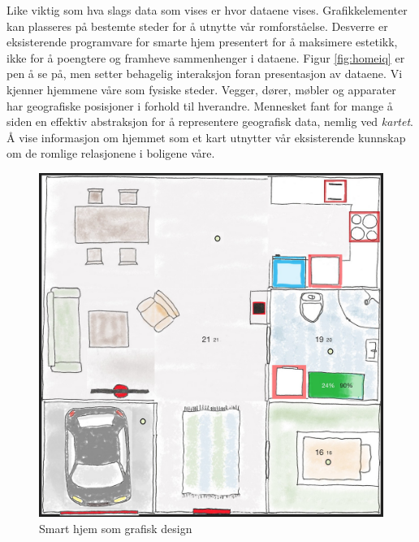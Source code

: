 Like viktig som hva slags data som vises er hvor dataene vises. Grafikkelementer kan plasseres på bestemte steder for å utnytte vår romforståelse. Desverre er eksisterende programvare for smarte hjem presentert for å maksimere estetikk, ikke for å poengtere og framheve sammenhenger i dataene. Figur \ref{fig:homeiq} er pen å se på, men setter behagelig interaksjon foran presentasjon av dataene. Vi kjenner hjemmene våre som fysiske steder. Vegger, dører, møbler og apparater har geografiske posisjoner i forhold til hverandre. Mennesket fant for mange å siden en effektiv abstraksjon for å representere geografisk data, nemlig ved \emph{kartet}. Å vise informasjon om hjemmet som et kart utnytter vår eksisterende kunnskap om de romlige relasjonene i boligene våre.
\begin{figure}
\centering
\includegraphics[scale=0.25]{fig/smarthome}
\caption{Smart hjem som grafisk design}
\label{fig:smarthjemgrafisk}
\end{figure}
